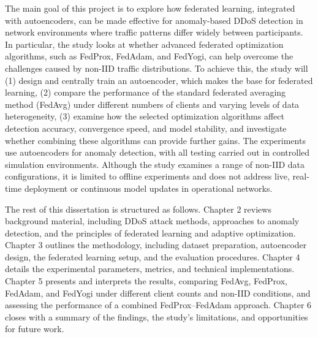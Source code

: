 The main goal of this project is to explore how federated learning, integrated with autoencoders, can be made effective for anomaly-based DDoS detection in network environments where traffic patterns differ widely between participants. In particular, the study looks at whether advanced federated optimization algorithms, such as FedProx, FedAdam, and FedYogi, can help overcome the challenges caused by non-IID traffic distributions. To achieve this, the study will (1) design and centrally train an autoencoder, which makes the base for federated learning, (2) compare the performance of the standard federated averaging method (FedAvg) under different numbers of clients and varying levels of data heterogeneity, (3) examine how the selected optimization algorithms affect detection accuracy, convergence speed, and model stability, and investigate whether combining these algorithms can provide further gains. The experiments use autoencoders for anomaly detection, with all testing carried out in controlled simulation environments. Although the study examines a range of non-IID data configurations, it is limited to offline experiments and does not address live, real-time deployment or continuous model updates in operational networks.

The rest of this dissertation is structured as follows. Chapter 2 reviews background material, including DDoS attack methods, approaches to anomaly detection, and the principles of federated learning and adaptive optimization. Chapter 3 outlines the methodology, including dataset preparation, autoencoder design, the federated learning setup, and the evaluation procedures. Chapter 4 details the experimental parameters, metrics, and technical implementations. Chapter 5 presents and interprets the results, comparing FedAvg, FedProx, FedAdam, and FedYogi under different client counts and non-IID conditions, and assessing the performance of a combined FedProx–FedAdam approach. Chapter 6 closes with a summary of the findings, the study’s limitations, and opportunities for future work.

